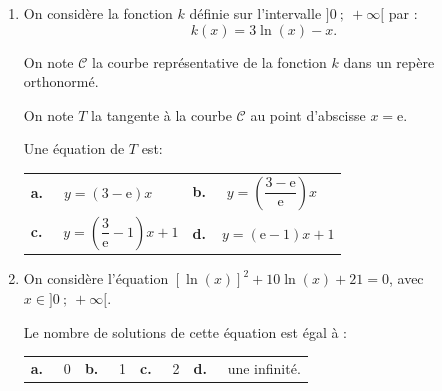 \begin{enumerate}
\begin{center}
\begin{tabularx}{\linewidth}{*{2}{X}}
en $x = 3,5$.
\end{tabularx}
\end{center}

\item On considère la fonction $k$ définie sur l'intervalle $]0~;~ +\infty[$ par :
\[k(x) = 3 \ln (x) - x.\]

On note $\mathcal{C}$ la courbe représentative de la fonction $k$ dans un repère orthonormé.

On note $T$ la tangente à la courbe $\mathcal{C}$ au point d'abscisse $x = \text{e}$.

Une équation de $T$ est:

\begin{center}
\begin{tabularx}{\linewidth}{*{2}{X}}
\textbf{a.~~} $y = (3 - \text{e})x$&\textbf{b.~~} $y = \left(\dfrac{3 - \text{e}}{\text{e}}\right)x$\\
\textbf{c.~~} $y = \left(\dfrac{3}{\text{e} }- 1\right)x + 1$&\textbf{d.~~}$y = (\text{e} - 1)x + 1$
\end{tabularx}
\end{center}
\item On considère l'équation $[\ln (x)]^2 + 10 \ln (x) + 21 = 0$, avec $x \in ]0~;~+\infty[$.

Le nombre de solutions de cette équation est égal à :
\begin{center}
\begin{tabularx}{\linewidth}{*{4}{X}}
\textbf{a.~~} 0&\textbf{b.~~} 1&\textbf{c.~~} 2&\textbf{d.~~} une infinité.
\end{tabularx}
\end{center}
\end{enumerate}

